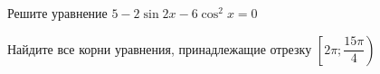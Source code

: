 \begin{ex}
	\begin{condition}
		\begin{enumcols}[label=\asbuk*)]
			\item Решите уравнение \( 5-2\sin 2x - 6\cos^2 x=0 \)
			\item Найдите все корни уравнения, принадлежащие отрезку \( \left[2\pi;\dfrac{15\pi}{4}\right) \)
		\end{enumcols}
	\end{condition}
\end{ex}